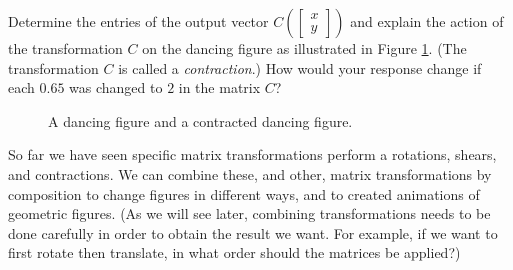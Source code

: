 \begin{pactivity}
Determine the entries of the output vector $C\left(\left[ \begin{array}{c} x \\ y \end{array} \right] \right)$ and explain the action of the transformation $C$ on the dancing figure as illustrated in Figure \ref{F:Contract_Dance}. (The transformation $C$ is called a \emph{contraction}.) How would your response change if each $0.65$ was changed to $2$ in the matrix $C$? 
\begin{figure}[ht]
\begin{center}
\caption{A dancing figure and a contracted dancing figure.}
\label{F:Contract_Dance}
\end{center}
\end{figure} 

\ea

\end{pactivity}

So far we have seen specific matrix transformations perform a rotations, shears, and contractions. We can combine these, and other, matrix transformations by composition to change figures in different ways, and to created animations of geometric figures. (As we will see later, combining transformations needs to be done carefully in order to obtain the result we want. For example, if we want to first rotate then translate, in what order should the matrices be applied?)


